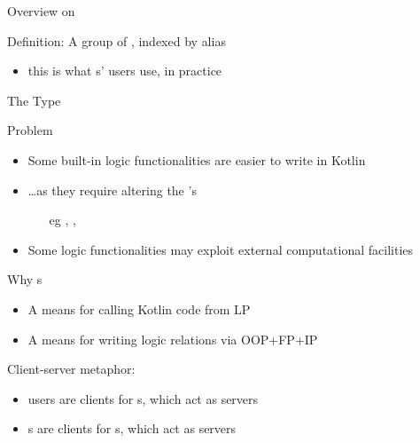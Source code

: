 \documentclass[handout]{beamer}
\begin{document}
\begin{frame}[allowframebreaks]{Overview on }
    \framebreak

    \begin{block}{Definition: }
        A group of , indexed by \alert{alias}
    \end{block}
    \begin{itemize}
        \item this is what s' users use, in practice
    \end{itemize}

    \framebreak


\end{frame}

\begin{frame}[allowframebreaks]{The  Type}

    \begin{alertblock}{Problem}
        \begin{itemize}
            \item Some built-in logic functionalities are easier to write in Kotlin
            \item \ldots as they require \alert{altering} the 's 
            \begin{itemize}
                \item[eg] , , 
            \end{itemize}
            \item Some logic functionalities may exploit external computational facilities
        \end{itemize}
    \end{alertblock}

    \begin{block}{Why s}
        \begin{itemize}
            \item A means for calling Kotlin code from LP
            \item A means for writing logic \alert{relations} via OOP+FP+IP
        \end{itemize}
    \end{block}

    \framebreak

    Client-server metaphor:
    \begin{itemize}
        \item users are clients for s, which act as servers
        \item {}s are clients for s, which act as servers
    \end{itemize}


\end{frame}
\end{document}
